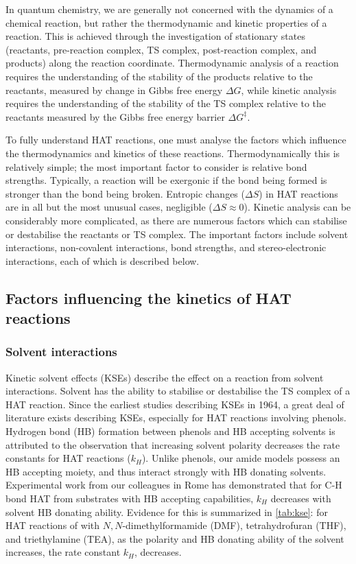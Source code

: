 In quantum chemistry, we are generally not concerned with the dynamics of a
chemical reaction, but rather the thermodynamic and kinetic properties of a
reaction. This is achieved through the investigation of stationary states
(reactants, pre-reaction complex, TS complex, post-reaction complex, and
products) along the reaction coordinate. Thermodynamic analysis of a reaction
requires the understanding of the stability of the products relative to the
reactants, measured by change in Gibbs free energy $\Delta G$, while kinetic
analysis requires the understanding of the stability of the TS complex relative
to the reactants measured by the Gibbs free energy
barrier $\Delta G^{\ddagger}$.

To fully understand HAT reactions, one must analyse the factors which influence
the thermodynamics and kinetics of these reactions. Thermodynamically this is
relatively simple; the most important factor to consider is relative bond
strengths. Typically, a reaction will be exergonic if the bond being formed is
stronger than the bond being broken. Entropic changes ($\Delta S$) in HAT
reactions are in all but the most unusual cases, negligible
($\Delta S \approx 0$).\cite{Mader2007} Kinetic analysis can be considerably
more complicated, as there are numerous factors which can stabilise or
destabilise the reactants or TS complex. The important factors include solvent
interactions, non-covalent interactions, bond strengths, and stereo-electronic
interactions, each of which is described below.

\subsection{Factors influencing the kinetics of HAT reactions}

\subsubsection{Solvent interactions}

Kinetic solvent effects (KSEs) describe the effect on a reaction from solvent
interactions. Solvent has the ability to stabilise or destabilise the TS complex
of a HAT reaction. Since the earliest studies describing KSEs in
1964,\cite{Howard1964} a great deal of literature exists describing KSEs,
especially for HAT reactions involving phenols.\cite{note2} Hydrogen bond (HB)
formation between phenols and HB accepting solvents is attributed to the
observation that increasing solvent polarity decreases the rate constants for
HAT reactions ($k_H$). Unlike phenols, our amide models possess an HB accepting
moiety, and thus interact strongly with HB donating solvents. Experimental work
from our colleagues in Rome has demonstrated that for C-H bond HAT from
substrates with HB accepting capabilities, $k_H$ decreases with solvent HB
donating ability. Evidence for this is summarized in \ref{tab:kse}: for HAT
reactions of \cumo with $N,N$-dimethylformamide (DMF), tetrahydrofuran (THF),
and triethylamine (TEA), as the polarity and HB donating ability of the solvent
increases, the rate constant $k_H$, decreases.


